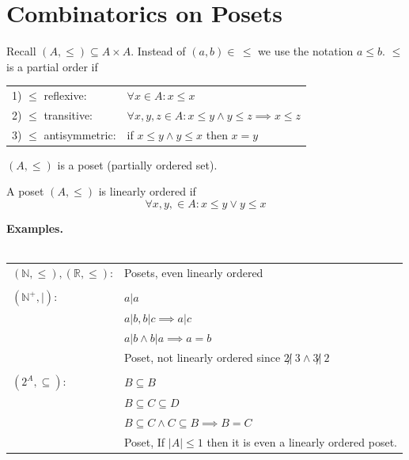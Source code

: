 
\section{Combinatorics on Posets}

Recall $(A, \leq) \subseteq A \times A$.
Instead of $(a,b) \in \, \leq$ we use the notation $a \leq b$. $\leq$ is a partial order if

\begin{tabular}{ll}
  1) $\leq$ reflexive: &
    $\forall x \in A: x \leq x$ \\
  2) $\leq$ transitive:  &
    $\forall x,y,z \in A: x \leq y \land y \leq z \implies x \leq z$ \\
  3) $\leq$ antisymmetric: &
    if $x \leq y \land y \leq x$ then $x = y$ \\
\end{tabular}

$(A,\leq)$ is a poset (partially ordered set).

A poset $(A,\leq)$ is linearly ordered if
\[
  \forall x,y, \in A: x \leq y \lor y \leq x
\]

\textbf{Examples.}\\\\
\begin{tabular}{l l}
  $(\mathbb{N}, \leq), (\mathbb{R}, \leq)$: & Posets, even linearly ordered \\\\

  $(\mathbb{N}^{+}, |)$:
    & $a|a$ \\
    & $ a|b, b|c \implies a|c$\\
    & $ a|b \land b|a \implies a = b$\\
    & Poset, not linearly ordered since $2 \not|~ 3 \land 3 \not|~ 2$\\\\

  $(2^A, \subseteq)$:
    & $ B \subseteq B$\\
    & $ B \subseteq C \subseteq D$\\
    & $ B \subseteq C \land C \subseteq B \implies B = C$ \\
    & Poset, If $|A|\leq 1$ then it is even a linearly ordered poset.
\end{tabular}


